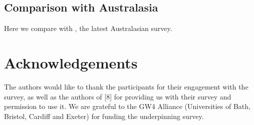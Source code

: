 \documentclass{sig-alternate}
\begin{document}
\subsection{Comparison with Australasia}
Here we compare with \cite{mason+cooper:2014}, the latest Australasian survey.


\section{Acknowledgements}

The authors would like to thank the participants for their engagement
with the survey, as well as the authors of [8] for providing us with their survey and permission to use it.
We are grateful to the GW4 Alliance (Universities of Bath, Bristol, Cardiff and Exeter) for funding the underpinning survey.


\end{document}
